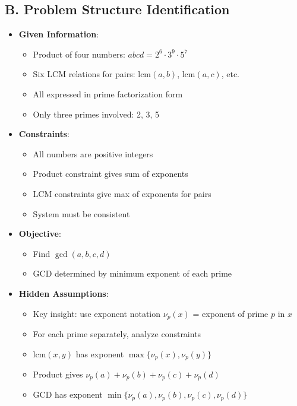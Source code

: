 \documentclass[12pt]{article}
\begin{document}
\begin{problemconfigbox}
\subsection*{B. Problem Structure Identification}
\begin{itemize}[leftmargin=*]
    \item \textbf{Given Information}: 
    \begin{itemize}
        \item Product of four numbers: $abcd = 2^6 \cdot 3^9 \cdot 5^7$
        \item Six LCM relations for pairs: $\text{lcm}(a,b)$, $\text{lcm}(a,c)$, etc.
        \item All expressed in prime factorization form
        \item Only three primes involved: 2, 3, 5
    \end{itemize}
    \item \textbf{Constraints}: 
    \begin{itemize}
        \item All numbers are positive integers
        \item Product constraint gives sum of exponents
        \item LCM constraints give max of exponents for pairs
        \item System must be consistent
    \end{itemize}
    \item \textbf{Objective}: 
    \begin{itemize}
        \item Find $\gcd(a,b,c,d)$
        \item GCD determined by minimum exponent of each prime
    \end{itemize}
    \item \textbf{Hidden Assumptions}: 
    \begin{itemize}
        \item Key insight: use exponent notation $\nu_p(x)$ = exponent of prime $p$ in $x$
        \item For each prime separately, analyze constraints
        \item $\text{lcm}(x,y)$ has exponent $\max\{\nu_p(x), \nu_p(y)\}$
        \item Product gives $\nu_p(a) + \nu_p(b) + \nu_p(c) + \nu_p(d)$
        \item GCD has exponent $\min\{\nu_p(a), \nu_p(b), \nu_p(c), \nu_p(d)\}$
    \end{itemize}

\end{itemize}
\end{problemconfigbox}
\end{document}
